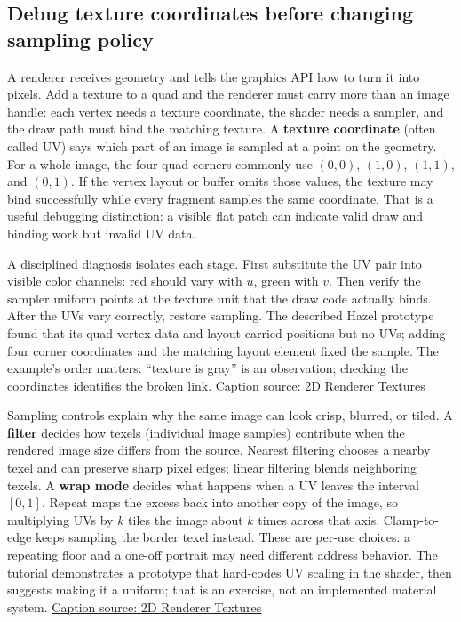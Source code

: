 \subsection{Debug texture coordinates before changing sampling policy}\label{06-engine-ii-ch027-debug-texture-coordinates-before-changing-sampling-policy}

A renderer receives geometry and tells the graphics API how to turn it into pixels. Add a texture to a quad and the renderer must carry more than an image handle: each vertex needs a texture coordinate, the shader needs a sampler, and the draw path must bind the matching texture. A \textbf{texture coordinate} (often called UV) says which part of an image is sampled at a point on the geometry. For a whole image, the four quad corners commonly use \((0,0)\), \((1,0)\), \((1,1)\), and \((0,1)\). If the vertex layout or buffer omits those values, the texture may bind successfully while every fragment samples the same coordinate. That is a useful debugging distinction: a visible flat patch can indicate valid draw and binding work but invalid UV data.

A disciplined diagnosis isolates each stage. First substitute the UV pair into visible color channels: red should vary with \(u\), green with \(v\). Then verify the sampler uniform points at the texture unit that the draw code actually binds. After the UVs vary correctly, restore sampling. The described Hazel prototype found that its quad vertex data and layout carried positions but no UVs; adding four corner coordinates and the matching layout element fixed the sample. The example's order matters: ``texture is gray'' is an observation; checking the coordinates identifies the broken link. \href{https://www.youtube.com/watch?v=mW8eW3pLtmk}{Caption source: 2D Renderer Textures}

Sampling controls explain why the same image can look crisp, blurred, or tiled. A \textbf{filter} decides how texels (individual image samples) contribute when the rendered image size differs from the source. Nearest filtering chooses a nearby texel and can preserve sharp pixel edges; linear filtering blends neighboring texels. A \textbf{wrap mode} decides what happens when a UV leaves the interval \([0,1]\). Repeat maps the excess back into another copy of the image, so multiplying UVs by \(k\) tiles the image about \(k\) times across that axis. Clamp-to-edge keeps sampling the border texel instead. These are per-use choices: a repeating floor and a one-off portrait may need different address behavior. The tutorial demonstrates a prototype that hard-codes UV scaling in the shader, then suggests making it a uniform; that is an exercise, not an implemented material system. \href{https://www.youtube.com/watch?v=mW8eW3pLtmk}{Caption source: 2D Renderer Textures}


